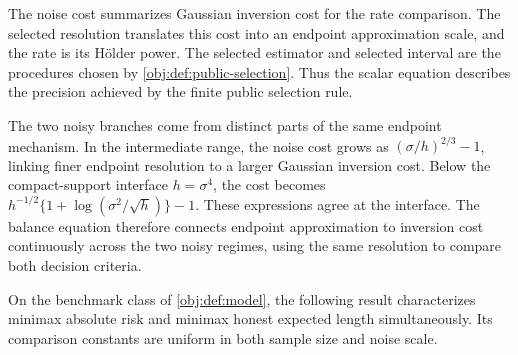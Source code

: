 \documentclass[11pt]{article}
\begin{document}
The noise cost  summarizes Gaussian inversion cost for the rate comparison. The selected resolution  translates this cost into an endpoint approximation scale, and the rate  is its Hölder power. The selected estimator  and selected interval  are the procedures chosen by \cref{obj:def:public-selection}. Thus the scalar equation describes the precision achieved by the finite public selection rule.

The two noisy branches come from distinct parts of the same endpoint mechanism. In the intermediate range, the noise cost grows as \((\sigma/h)^{2/3}-1\), linking finer endpoint resolution to a larger Gaussian inversion cost. Below the compact-support interface \(h=\sigma^4\), the cost becomes \(h^{-1/2}\{1+\log(\sigma^2/\sqrt h)\}-1\). These expressions agree at the interface. The balance equation therefore connects endpoint approximation to inversion cost continuously across the two noisy regimes, using the same resolution to compare both decision criteria.

On the benchmark class of \cref{obj:def:model}, the following result characterizes minimax absolute risk and minimax honest expected length simultaneously. Its comparison constants are uniform in both sample size and noise scale.
\end{document}
